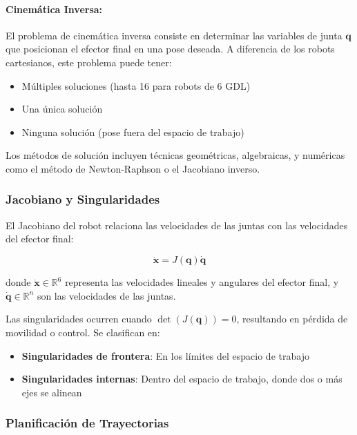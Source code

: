 \paragraph{Cinemática Inversa:}

El problema de cinemática inversa consiste en determinar las variables de junta $\mathbf{q}$ que posicionan el efector final en una pose deseada. A diferencia de los robots cartesianos, este problema puede tener:

\begin{itemize}
    \item Múltiples soluciones (hasta 16 para robots de 6 GDL)
    \item Una única solución
    \item Ninguna solución (pose fuera del espacio de trabajo)
\end{itemize}

Los métodos de solución incluyen técnicas geométricas, algebraicas, y numéricas como el método de Newton-Raphson o el Jacobiano inverso.

\subsubsection{Jacobiano y Singularidades}

El Jacobiano del robot relaciona las velocidades de las juntas con las velocidades del efector final:

\begin{equation}
\dot{\mathbf{x}} = J(\mathbf{q}) \dot{\mathbf{q}}
\end{equation}

donde $\dot{\mathbf{x}} \in \mathbb{R}^6$ representa las velocidades lineales y angulares del efector final, y $\dot{\mathbf{q}} \in \mathbb{R}^n$ son las velocidades de las juntas.

Las singularidades ocurren cuando $\det(J(\mathbf{q})) = 0$, resultando en pérdida de movilidad o control. Se clasifican en:

\begin{itemize}
    \item \textbf{Singularidades de frontera}: En los límites del espacio de trabajo
    \item \textbf{Singularidades internas}: Dentro del espacio de trabajo, donde dos o más ejes se alinean
\end{itemize}

\subsubsection{Planificación de Trayectorias}

